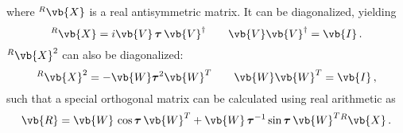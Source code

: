     where ${}^R \vb{X}$ is a real antisymmetric matrix. It can be diagonalized, yielding
    \begin{equation}
        {}^R \vb{X} = i \vb{V} \thinspace \boldsymbol{\tau} \thinspace \vb{V}^\dagger \qquad \vb{V} \vb{V}^\dagger = \vb{I} \thinspace .
    \end{equation}
    ${}^R \vb{X}^2$ can also be diagonalized:
    \begin{equation}
        {}^R \vb{X}^2 = - \vb{W} \boldsymbol{\tau}^2 \vb{W}^T \qquad \vb{W} \vb{W}^T = \vb{I} \thinspace ,
    \end{equation}
    such that a special orthogonal matrix can be calculated using real arithmetic as
    \begin{equation}
        \vb{R} = \vb{W} \thinspace \cos \boldsymbol{\tau} \thinspace \vb{W}^T + \vb{W} \thinspace \boldsymbol{\tau}^{-1} \sin \boldsymbol{\tau} \thinspace \vb{W}^T {}^R \vb{X} \thinspace .
    \end{equation}
